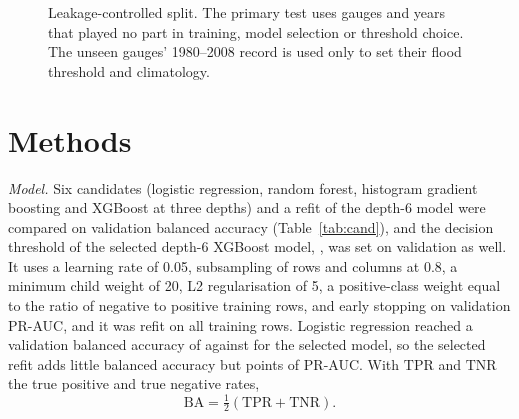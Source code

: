 \documentclass[conference]{IEEEtran}
\begin{document}
\begin{figure}[t]
\centering
{}
\caption{Leakage-controlled split. The primary test uses gauges and years that played no part in training, model selection or threshold choice. The unseen gauges' 1980--2008 record is used only to set their flood threshold and climatology.}
\label{fig:split}
\end{figure}

\section{Methods}
\textit{Model.} Six candidates (logistic regression, random forest, histogram gradient boosting and XGBoost \cite{Chen2016} at three depths) and a refit of the depth-6 model were compared on validation balanced accuracy (Table~\ref{tab:cand}), and the decision threshold of the selected depth-6 XGBoost model, \Thr, was set on validation as well. It uses a learning rate of 0.05, subsampling of rows and columns at 0.8, a minimum child weight of 20, L2 regularisation of 5, a positive-class weight equal to the ratio of negative to positive training rows, and early stopping on validation PR-AUC, and it was refit on all training rows. Logistic regression reached a validation balanced accuracy of \CandLrBA{} against \CandSelBA{} for the selected model, so the selected refit adds little balanced accuracy but \CandGainPR{} points of PR-AUC. With $\mathrm{TPR}$ and $\mathrm{TNR}$ the true positive and true negative rates,
\begin{equation}
\mathrm{BA}=\tfrac12\left(\mathrm{TPR}+\mathrm{TNR}\right).
\label{eq:ba}
\end{equation}
\end{document}
